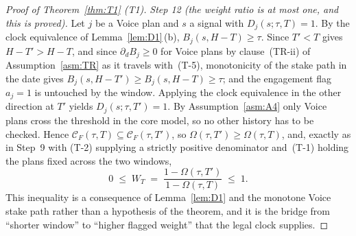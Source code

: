 \begin{proof}[Proof of Theorem~\ref{thm:T1} (T1)]
\emph{Step 12 (the weight ratio is at most one, and this is proved).} Let $j$ be a Voice plan and
$s$ a signal with $D_j(s;\tau,T) = 1$. By the clock equivalence of Lemma~\ref{lem:D1}\,(b),
$B_j(s,H-T) \ge \tau$. Since $T' < T$ gives $H-T' > H-T$, and since $\partial_d B_j \ge 0$ for Voice
plans by clause~(TR-ii) of Assumption~\ref{asm:TR} as it travels with~(T-5), monotonicity of the
stake path in the date gives $B_j(s,H-T') \ge B_j(s,H-T) \ge \tau$; and the engagement flag $a_j=1$
is untouched by the window. Applying the clock equivalence in the other direction at $T'$ yields
$D_j(s;\tau,T') = 1$. By Assumption~\ref{asm:A4} only Voice plans cross the threshold in the core
model, so no other history has to be checked. Hence $\mathcal C_F(\tau,T) \subseteq
\mathcal C_F(\tau,T')$, so $\Omega(\tau,T') \ge \Omega(\tau,T)$, and, exactly as in Step~9 with
\mbox{(T-2)} supplying a strictly positive denominator and~(T-1) holding the plans fixed across the
two windows,
\[
0 \;\le\; W_T \;=\; \frac{1-\Omega(\tau,T')}{1-\Omega(\tau,T)} \;\le\; 1 .
\]
This inequality is a consequence of Lemma~\ref{lem:D1} and the monotone Voice stake path rather
than a hypothesis of the theorem, and it is the bridge from ``shorter window'' to ``higher flagged
weight'' that the legal clock supplies.


\end{proof}
